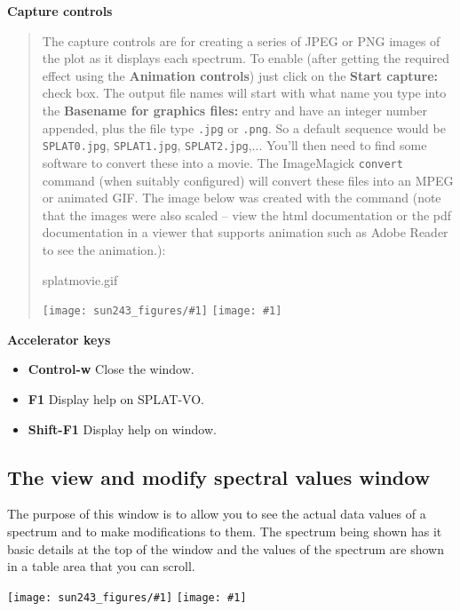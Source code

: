 \documentclass[twoside,11pt,nolof]{starlink}
\providecommand{\SPLAT}{\textsf{SPLAT-VO}}
\providecommand{\mainfigure}[1]
{\begin{center}
    \ifpdf
    \texttt{[image: sun243\_figures/\#1]}
    \else
    \texttt{[image: \#1]}
    \fi
 \end{center}
}
\providecommand{\inline}[1]
        {\ifpdf
          \texttt{[image: sun243\_figures/\#1]}
          \else
          \texttt{[image: \#1]}
          \fi
        }
\newcommand{\labelitem}[1]{\textbf{#1}}
\providecommand{\hitext}[1]{\texttt{#1}}
\providecommand{\subheading}[1]{\textbf{\large{#1}}}
\begin{document}
\subheading{Capture controls}
\begin{quote}
 The capture controls are for creating a series of JPEG or PNG images of the
 plot as it displays each spectrum. To enable (after getting the
 required effect using the \labelitem{Animation controls}) just click
 on the \labelitem{Start capture:} check box. The output file names
 will start with what name you type into the \labelitem{Basename for
 graphics files:} entry and have an integer number appended, plus the file type
 \hitext{.jpg} or \hitext{.png}. So a default sequence would be
 \hitext{SPLAT0.jpg}, \hitext{SPLAT1.jpg}, \hitext{SPLAT2.jpg},...
 You'll then need to find some software to convert these into a movie.
 The ImageMagick \hitext{convert} command (when suitably configured)
 will convert these files into an MPEG or animated GIF.
 The image below was created with the command (note that the images were also
 scaled -- view the html documentation or the pdf documentation in a viewer
 that supports animation such as Adobe Reader to see the animation.):
\begin{terminalv}
       splatmovie.gif
\end{terminalv}

\ifpdf
{}
\else
\inline{splatmovie}
\fi
\end{quote}

\subheading{Accelerator keys}

\begin{itemize}
\item \labelitem{Control-w} Close the window.
\item \labelitem{F1} Display help on \SPLAT.
\item \labelitem{Shift-F1} Display help on window.
\end{itemize}

\newpage
\subsection{The view and modify spectral values window}

The purpose of this window is to allow you to see the actual data
values of a spectrum and to make modifications to them.
The spectrum being shown has it basic details at the top of the window
and the values of the spectrum are shown in a table area that you can
scroll.

\mainfigure{viewwindow}
\end{document}
